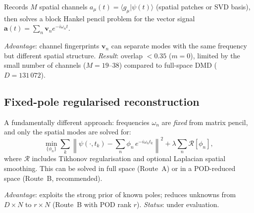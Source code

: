 \documentclass[11pt,a4paper]{article}
\newcommand{\vb}[1]{\mathbf{#1}}
\begin{document}
Records $M$ spatial channels
$a_\mu(t) = \langle g_\mu|\psi(t)\rangle$ (spatial patches or SVD
basis), then solves a block Hankel pencil problem for the vector
signal $\vb{a}(t) = \sum_n \vb{v}_n e^{-i\omega_n t}$.

\emph{Advantage}: channel fingerprints $\vb{v}_n$ can separate modes
with the same frequency but different spatial structure.
\emph{Result}: overlap $<0.35$ ($m=0$), limited by the small number
of channels ($M = 19$--$38$) compared to full-space DMD ($D = 131\,072$).

\subsection{Fixed-pole regularised reconstruction}

A fundamentally different approach: frequencies $\omega_n$ are
\emph{fixed} from matrix pencil, and only the spatial modes are
solved for:
\begin{equation}
  \min_{\{\phi_n\}} \sum_k \left\|\psi(\cdot, t_k)
  - \sum_n \phi_n\, e^{-i\omega_n t_k}\right\|^2
  + \lambda\sum_n \mathcal{R}[\phi_n],
\end{equation}
where $\mathcal{R}$ includes Tikhonov regularisation and optional
Laplacian spatial smoothing.  This can be solved in full space
(Route~A) or in a POD-reduced space (Route~B, recommended).

\emph{Advantage}: exploits the strong prior of known poles; reduces
unknowns from $D\times N$ to $r\times N$ (Route~B with POD rank $r$).
\emph{Status}: under evaluation.
\end{document}
